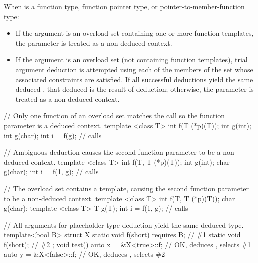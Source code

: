 \pnum
When
is a function type, function pointer type, or pointer-to-member-function type:
\begin{itemize}
\item
If the argument is an overload set containing one or more function templates,
the parameter is treated as a non-deduced context.
\item
If the argument is an overload set (not containing function templates), trial
argument deduction is attempted using each of the members of the set
whose associated constraints are satisfied.
If all successful deductions yield the same deduced ,
that deduced  is the result of deduction;
otherwise, the parameter is treated as a non-deduced context.
\end{itemize}

\pnum
\begin{example}
\begin{codeblock}
// Only one function of an overload set matches the call so the function parameter is a deduced context.
template <class T> int f(T (*p)(T));
int g(int);
int g(char);
int i = f(g);       // calls 
\end{codeblock}
\end{example}

\pnum
\begin{example}
\begin{codeblock}
// Ambiguous deduction causes the second function parameter to be a non-deduced context.
template <class T> int f(T, T (*p)(T));
int g(int);
char g(char);
int i = f(1, g);    // calls 
\end{codeblock}
\end{example}

\pnum
\begin{example}
\begin{codeblock}
// The overload set contains a template, causing the second function parameter to be a non-deduced context.
template <class T> int f(T, T (*p)(T));
char g(char);
template <class T> T g(T);
int i = f(1, g);    // calls 
\end{codeblock}
\end{example}

\pnum
\begin{example}
\begin{codeblock}
// All arguments for placeholder type deduction yield the same deduced type.
template<bool B> struct X {
  static void f(short) requires B;  // \#1
  static void f(short);             // \#2
};
void test() {
  auto x = &X<true>::f;     // OK, deduces , selects \#1
  auto y = &X<false>::f;    // OK, deduces , selects \#2
}
\end{codeblock}
\end{example}


